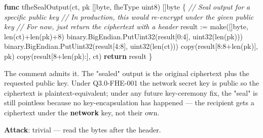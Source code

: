 \documentclass[
]{article}
\newenvironment{Shaded}{}{}
\newcommand{\BuiltInTok}[1]{\textcolor[rgb]{0.00,0.50,0.00}{#1}}
\newcommand{\CommentTok}[1]{\textcolor[rgb]{0.38,0.63,0.69}{\textit{#1}}}
\newcommand{\ControlFlowTok}[1]{\textcolor[rgb]{0.00,0.44,0.13}{\textbf{#1}}}
\newcommand{\DataTypeTok}[1]{\textcolor[rgb]{0.56,0.13,0.00}{#1}}
\newcommand{\DecValTok}[1]{\textcolor[rgb]{0.25,0.63,0.44}{#1}}
\newcommand{\KeywordTok}[1]{\textcolor[rgb]{0.00,0.44,0.13}{\textbf{#1}}}
\newcommand{\NormalTok}[1]{#1}
\newcommand{\OperatorTok}[1]{\textcolor[rgb]{0.40,0.40,0.40}{#1}}
\begin{document}
\begin{Shaded}
\begin{Highlighting}[]
\KeywordTok{func}\NormalTok{ tfheSealOutput}\OperatorTok{(}\NormalTok{ct}\OperatorTok{,}\NormalTok{ pk }\OperatorTok{[]}\DataTypeTok{byte}\OperatorTok{,}\NormalTok{ fheType }\DataTypeTok{uint8}\OperatorTok{)} \OperatorTok{[]}\DataTypeTok{byte} \OperatorTok{\{}
    \CommentTok{// Seal output for a specific public key}
    \CommentTok{// In production, this would re{-}encrypt under the given public key}
    \CommentTok{// For now, just return the ciphertext with a header}
\NormalTok{    result }\OperatorTok{:=} \BuiltInTok{make}\OperatorTok{([]}\DataTypeTok{byte}\OperatorTok{,} \BuiltInTok{len}\OperatorTok{(}\NormalTok{ct}\OperatorTok{)+}\BuiltInTok{len}\OperatorTok{(}\NormalTok{pk}\OperatorTok{)+}\DecValTok{8}\OperatorTok{)}
\NormalTok{    binary}\OperatorTok{.}\NormalTok{BigEndian}\OperatorTok{.}\NormalTok{PutUint32}\OperatorTok{(}\NormalTok{result}\OperatorTok{[}\DecValTok{0}\OperatorTok{:}\DecValTok{4}\OperatorTok{],} \DataTypeTok{uint32}\OperatorTok{(}\BuiltInTok{len}\OperatorTok{(}\NormalTok{pk}\OperatorTok{)))}
\NormalTok{    binary}\OperatorTok{.}\NormalTok{BigEndian}\OperatorTok{.}\NormalTok{PutUint32}\OperatorTok{(}\NormalTok{result}\OperatorTok{[}\DecValTok{4}\OperatorTok{:}\DecValTok{8}\OperatorTok{],} \DataTypeTok{uint32}\OperatorTok{(}\BuiltInTok{len}\OperatorTok{(}\NormalTok{ct}\OperatorTok{)))}
    \BuiltInTok{copy}\OperatorTok{(}\NormalTok{result}\OperatorTok{[}\DecValTok{8}\OperatorTok{:}\DecValTok{8}\OperatorTok{+}\BuiltInTok{len}\OperatorTok{(}\NormalTok{pk}\OperatorTok{)],}\NormalTok{ pk}\OperatorTok{)}
    \BuiltInTok{copy}\OperatorTok{(}\NormalTok{result}\OperatorTok{[}\DecValTok{8}\OperatorTok{+}\BuiltInTok{len}\OperatorTok{(}\NormalTok{pk}\OperatorTok{):],}\NormalTok{ ct}\OperatorTok{)}
    \ControlFlowTok{return}\NormalTok{ result}
\OperatorTok{\}}
\end{Highlighting}
\end{Shaded}

The comment admits it. The "sealed" output is the original ciphertext
plus the requested public key. Under Q3.0-FHE-001 the network secret key
is public so the ciphertext is plaintext-equivalent; under any future
key-ceremony fix, the "seal" is still pointless because no
key-encapsulation has happened --- the recipient gets a ciphertext under
the \textbf{network} key, not their own.

\textbf{Attack}: trivial --- read the bytes after the header.
\end{document}
